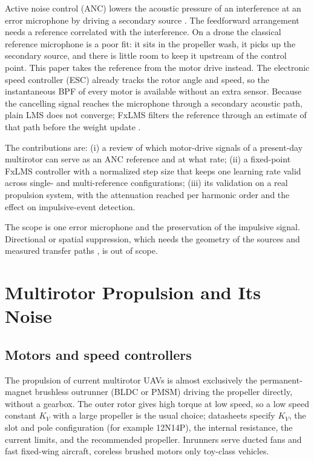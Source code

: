 \documentclass[conference]{IEEEtran}
\begin{document}
Active noise control (ANC) lowers the acoustic pressure of an interference at an error microphone by driving a secondary source \cite{elliott1993active,kuo1996anc}. The feedforward arrangement needs a reference correlated with the interference. On a drone the classical reference microphone is a poor fit: it sits in the propeller wash, it picks up the secondary source, and there is little room to keep it upstream of the control point. This paper takes the reference from the motor drive instead. The electronic speed controller (ESC) already tracks the rotor angle and speed, so the instantaneous BPF of every motor is available without an extra sensor. Because the cancelling signal reaches the microphone through a secondary acoustic path, plain LMS does not converge; FxLMS filters the reference through an estimate of that path before the weight update \cite{burgess1981duct,widrow1985adaptive}.

The contributions are: (i) a review of which motor-drive signals of a present-day multirotor can serve as an ANC reference and at what rate; (ii) a fixed-point FxLMS controller with a normalized step size that keeps one learning rate valid across single- and multi-reference configurations; (iii) its validation on a real propulsion system, with the attenuation reached per harmonic order and the effect on impulsive-event detection.

The scope is one error microphone and the preservation of the impulsive signal. Directional or spatial suppression, which needs the geometry of the sources and measured transfer paths \cite{bi2025directional,steiner2026drone}, is out of scope.

\section{Multirotor Propulsion and Its Noise}
\label{sec:propulsion}

\subsection{Motors and speed controllers}
The propulsion of current multirotor UAVs is almost exclusively the permanent-magnet brushless outrunner (BLDC or PMSM) driving the propeller directly, without a gearbox. The outer rotor gives high torque at low speed, so a low speed constant $K_V$ with a large propeller is the usual choice; datasheets specify $K_V$, the slot and pole configuration (for example 12N14P), the internal resistance, the current limits, and the recommended propeller. Inrunners serve ducted fans and fast fixed-wing aircraft, coreless brushed motors only toy-class vehicles.
\end{document}
